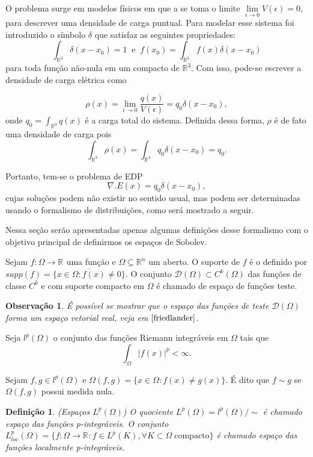 \documentclass[12pt]{book}
\newtheorem{definicao}[teorema]{Definição}
\newtheorem{observacao}[teorema]{Observação}
\newcommand{\espacoLp}[1]{L^{p}(#1)}
\newcommand{\espacoLpcomp}[1]{L^{p}_{loc}(#1)}
\newcommand{\espacoLpGeral}[2]{L^{#1}(#2)}
\newcommand{\funcoesdiferenciaveis}[2]{C^{#1}(#2)}
\newcommand{\funcoesteste}{\funcoestestegeral{\Omega}}
\newcommand{\funcoestestegeral}[1]{\mathcal{D}(#1)}
\newcommand{\real}[1]{\mathbb{R}^{#1}}
\newcommand{\reta}{\real{}}
\begin{document}
	O problema surge em modelos físicos em que a se toma o limite $\lim\limits_{\epsilon\to 0}V(\epsilon)=0$, para descrever uma densidade de carga puntual. Para modelar esse sistema foi introduzido o símbolo $\delta$ que satisfaz as seguintes propriedades:
	$$
	\int_{\real{3}}\delta(x-x_{0}) = 1\;\;\text{e}\;\; 	f(x_{0})=\int_{\real{3}}f(x)\delta(x-x_{0})
	$$
	para toda função não-nula em um compacto de $\real{3}$. Com isso, pode-se escrever a densidade de carga elétrica como
	
	$$
	\rho(x) = \lim_{\epsilon\to 0} \frac{q(x)}{V(\epsilon)} = q_{0}\delta(x - x_{0}),
	$$
	onde $q_{0} =\int_{\real{3}}q(x)$ é a carga total do sistema. Definida dessa forma, $\rho$ é de fato uma densidade de carga pois
	$$
	\int_{\real{3}}\rho(x) = \int_{\real{3}}q_{0}\delta(x-x_{0}) = q_{0}.
	$$
	
	Portanto, tem-se o problema de EDP
	$$
	\nabla.E(x) = q_{0}\delta(x-x_{0}),
	$$
	cujas soluções podem não existir no sentido usual, mas podem ser determinadas usando o formalismo de distribuições, como será mostrado a seguir.
	

	Nessa seção serão apresentadas apenas algumas definições desse formalismo com o objetivo principal de definirmos os espaços de Sobolev.
	
	Sejam $f:\Omega\to \reta$ uma função e $\Omega \subseteq \real{n}$ um aberto. O suporte de $f$ é o definido por $supp(f) = \overline{\{ x\in \Omega: f(x)\neq 0 \}}$. O conjunto $\funcoesteste \subset \funcoesdiferenciaveis{k}{\Omega}$ das funções de classe $C^{k}$ e com suporte compacto em $\Omega$ é chamado de espaço de funções teste.
	
	\begin{observacao}
		É possível se mostrar que o espaço das funções de teste $\funcoesteste$ forma um espaço vetorial real, veja em $\cite{friedlander}$.
	\end{observacao}
	
	Seja $l^{p}(\Omega)$ o conjunto das funções Riemann integráveis em $\Omega$ tais que 
	$$
	\int_{\Omega}|f(x)|^{p} <\infty.$$ 
	
	Sejam $f,g \in l^{p}(\Omega)$ e $\Omega(f,g) = \{x\in \Omega: f(x) \neq g(x)\}$. É dito que $f \sim g$ se $\Omega(f,g)$ possui medida nula.
	
	\begin{definicao}\label{definicao_espaco_Lp}
		(Espaços $\espacoLpGeral{p}{\Omega}$) O quociente $\espacoLpGeral{p}{\Omega}=l^{p}(\Omega)/\sim$ é chamado espaço das funções p-integráveis. O conjunto $\espacoLpcomp{\Omega} = \{f:\Omega\to \reta: f \in \espacoLp{K}, \forall K \subset \Omega \;\text{compacto}\}$ é chamado espaço das funções localmente p-integráveis.
	\end{definicao}
	
\end{document}
